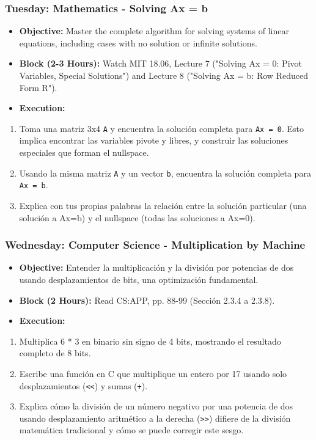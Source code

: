\documentclass[11pt,a4paper]{report}
\begin{document}
\subsubsection{\textbf{Tuesday: Mathematics - Solving Ax = b}}
\begin{itemize}
  \item \textbf{Objective:} Master the complete algorithm for solving systems of linear equations, including cases with no solution or infinite solutions.
  \item \textbf{Block (2-3 Hours):} Watch MIT 18.06, Lecture 7 ("Solving Ax = 0: Pivot Variables, Special Solutions") and Lecture 8 ("Solving Ax = b: Row Reduced Form R").
  \item \textbf{Execution:}
\end{itemize}
\begin{enumerate}
  \item Toma una matriz 3x4 \texttt{A} y encuentra la solución completa para \texttt{Ax = 0}. Esto implica encontrar las variables pivote y libres, y construir las soluciones especiales que forman el nullspace.
  \item Usando la misma matriz \texttt{A} y un vector \texttt{b}, encuentra la solución completa para \texttt{Ax = b}.
  \item Explica con tus propias palabras la relación entre la solución particular (una solución a Ax=b) y el nullspace (todas las soluciones a Ax=0).

\end{enumerate}
\subsubsection{\textbf{Wednesday: Computer Science - Multiplication by Machine}}
\begin{itemize}
  \item \textbf{Objective:} Entender la multiplicación y la división por potencias de dos usando desplazamientos de bits, una optimización fundamental.
  \item \textbf{Block (2 Hours):} Read CS:APP, pp. 88-99 (Sección 2.3.4 a 2.3.8).
  \item \textbf{Execution:}
\end{itemize}
\begin{enumerate}
  \item Multiplica 6 * 3 en binario sin signo de 4 bits, mostrando el resultado completo de 8 bits.
  \item Escribe una función en C que multiplique un entero por 17 usando solo desplazamientos (\texttt{\textless{}\textless{}}) y sumas (\texttt{+}).
  \item Explica cómo la división de un número negativo por una potencia de dos usando desplazamiento aritmético a la derecha (\texttt{\textgreater{}\textgreater{}}) difiere de la división matemática tradicional y cómo se puede corregir este sesgo.

\end{enumerate}
\end{document}
